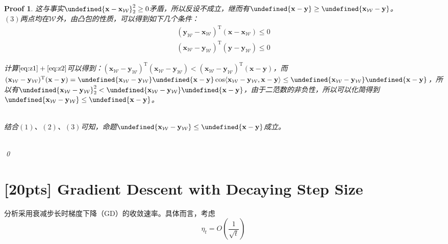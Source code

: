 \documentclass[a4paper,UTF8]{article}
\let\norm\undefined %
\DeclarePairedDelimiter\norm{\lVert}{\rVert}
\numberwithin{equation}{section}
\newtheorem*{myProof}{Proof}
\begin{document}
\begin{myProof}
这与事实$\norm{\mathbf{x} - \mathbf{x}_\mathcal{W}}_2^2 \ge 0$矛盾，所以反设不成立，继而有$\norm{\mathbf{x} - \mathbf{y}} \ge \norm{\mathbf{x}_\mathcal{W} - \mathbf{y}}$。
~\\
$(3)$两点均在$\mathcal{\mathcal{W}}$外，由凸包的性质，可以得到如下几个条件：
\begin{gather}
(\mathbf{y}_\mathcal{W} - \mathbf{x}_\mathcal{W})^\mathrm{T}(\mathbf{x} - \mathbf{x}_\mathcal{W}) \le 0 \label{eq:z1} \\
(\mathbf{x}_\mathcal{W} - \mathbf{y}_\mathcal{W})^\mathrm{T}(\mathbf{y} - \mathbf{y}_\mathcal{W}) \le 0 \label{eq:z2}
\end{gather}

计算$\ref{eq:z1} + \ref{eq:z2}$可以得到：$(\mathbf{x}_\mathcal{W} - \mathbf{y}_\mathcal{W})^\mathrm{T}(\mathbf{x}_\mathcal{W} - \mathbf{y}_\mathcal{W}) < (\mathbf{x}_\mathcal{W} - \mathbf{y}_\mathcal{W})^\mathrm{T}(\mathbf{x} - \mathbf{y})$，而$(\mathbf{x}_\mathcal{W} - \mathbf{y}_\mathcal{W})^\mathrm{T}(\mathbf{x} - \mathbf{y}) = \norm{\mathbf{x}_\mathcal{W} - \mathbf{y}_\mathcal{W}}\norm{\mathbf{x}-\mathbf{y}} \cos \langle \mathbf{x}_\mathcal{W} - \mathbf{y}_\mathcal{W}, \mathbf{x} - \mathbf{y} \rangle \le \norm{\mathbf{x}_\mathcal{W} - \mathbf{y}_\mathcal{W}}\norm{\mathbf{x} - \mathbf{y}}$，所以有$\norm{\mathbf{x}_\mathcal{W} - \mathbf{y}_\mathcal{W}}_2^2 < \norm {\mathbf{x}_\mathcal{W} - \mathbf{y}_\mathcal{W}}\norm{\mathbf{x} - \mathbf{y}}$，由于二范数的非负性，所以可以化简得到$\norm{\mathbf{x}_\mathcal{W} - \mathbf{y}_\mathcal{W}} \le \norm{\mathbf{x} - \mathbf{y}}$。

~\\
结合$(1)$、$(2)$、$(3)$可知，命题$\norm{\mathbf{x}_\mathcal{W} - \mathbf{y}_\mathcal{W}} \le \norm{\mathbf{x} - \mathbf{y}}$成立。


~\\

	\qed
\end{myProof}

\newpage
\section{[20pts] Gradient Descent with Decaying Step Size}
\noindent 分析采用衰减步长时梯度下降（GD）的收敛速率。具体而言，考虑
\[
\eta_t=O\left(\frac{1}{\sqrt{t}}\right)
\]
\end{document}
